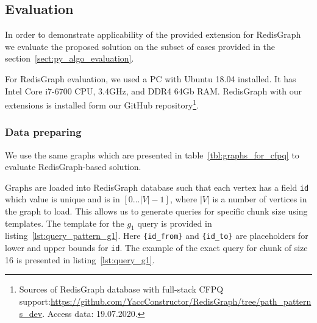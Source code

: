 \subsection{Evaluation}

In order to demonstrate applicability of the provided extension for RedisGraph we evaluate the proposed solution on the subset of cases provided in the section~\ref{sect:py_algo_evaluation}.

For RedisGraph evaluation, we used a PC with Ubuntu 18.04 installed.
It has Intel Core i7-6700 CPU, 3.4GHz, and DDR4 64Gb RAM. 
RedisGraph with our extensions is installed form our GitHub repository\footnote{Sources of RedisGraph database with full-stack CFPQ support:\url{https://github.com/YaccConstructor/RedisGraph/tree/path_patterns_dev}. Access data: 19.07.2020.}. 

\subsubsection{Data preparing}

We use the same graphs which are presented in table~\ref{tbl:graphs_for_cfpq} to evaluate RedisGraph-based solution.

Graphs are loaded into RedisGraph database such that each vertex has a field \verb|id| which value is unique and is in $[0 \ldots |V|-1]$, where $|V|$ is a number of vertices in the graph to load.
This allows us to generate queries for specific chunk size using templates.
The template for the $g_1$ query is provided in listing~\ref{lst:query_pattern_g1}.
Here \texttt{\{id\_from\}} and \texttt{\{id\_to\}} are placeholders for lower and upper bounds for \verb|id|. The example of the exact query for chunk of size 16 is presented in listing~\ref{lst:query_g1}.

\begin{algorithm}
\end{algorithm}

